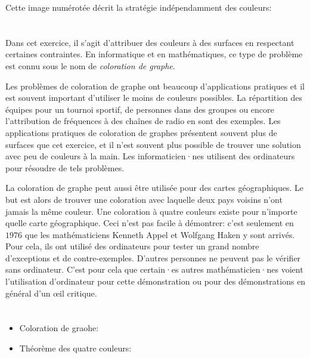 {{Cette image numérotée décrit la stratégie indépendamment des couleurs:

{\centering%
\par}



\section*{\BrochureItsInformatics}
Dans cet exercice, il s’agit d’attribuer des couleurs à des surfaces en respectant certaines contraintes. En informatique et en mathématiques, ce type de problème est connu sous le nom de \emph{coloration de graphe}.

Les problèmes de coloration de graphe ont beaucoup d’applications pratiques et il est souvent important d’utiliser le moins de couleurs possibles. La répartition des équipes pour un tournoi sportif, de personnes dans des groupes ou encore l’attribution de fréquences à des chaînes de radio en sont des exemples. Les applications pratiques de coloration de graphes présentent souvent plus de surfaces que cet exercice, et il n’est souvent plus possible de trouver une solution avec peu de couleurs à la main. Les informaticien·nes utilisent des ordinateurs pour résoudre de tels problèmes.

La coloration de graphe peut aussi être utilisée pour des cartes géographiques. Le but est alors de trouver une coloration avec laquelle deux pays voisins n’ont jamais la même couleur. Une coloration à quatre couleurs existe pour n’importe quelle carte géographique. Ceci n’est pas facile à démontrer: c’est seulement en $1976$ que les mathématiciens Kenneth Appel et Wolfgang Haken y sont arrivés. Pour cela, ils ont utilisé des ordinateurs pour tester un grand nombre d’exceptions et de contre-exemples. D’autres personnes ne peuvent pas le vérifier sans ordinateur. C’est pour cela que certain·es autres mathématicien·nes voient l’utilisation d’ordinateur pour cette démonstration ou pour des démonstrations en général d’un œil critique.



\section*{\BrochureWebsitesAndKeywords}
{\raggedright
\begin{itemize}
  \item Coloration de graohe: \href{https://fr.wikipedia.org/wiki/Coloration_de_graphe}{}
  \item Théorème des quatre couleurs: \href{https://fr.wikipedia.org/wiki/Th\%C3\%A9or\%C3\%A8me_des_quatre_couleurs}{}
\end{itemize}


}}}
